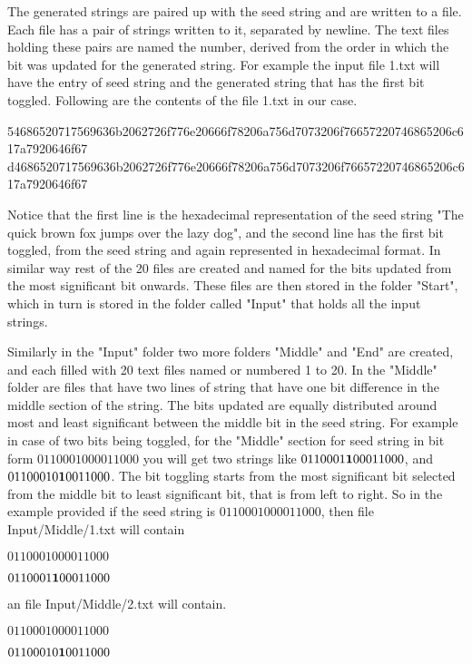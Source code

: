 The generated strings are paired up with the seed string and are written to a file. Each file has a pair of
strings written to it, separated by newline. The text files holding these pairs are named the number, derived
from the order in which the bit was updated for the generated string. For example the input file 1.txt will
have the entry of seed string and the generated string that has the first bit toggled. Following are the
contents of the file 1.txt in our case.

\begin{center}54686520717569636b2062726f776e20666f78206a756d7073206f76657220746865206c617a7920646f67
d4686520717569636b2062726f776e20666f78206a756d7073206f76657220746865206c617a7920646f67\end{center}

Notice that the first line is the hexadecimal representation of the seed string "The quick brown fox jumps over
the lazy dog", and the second line has the first bit toggled, from the seed string and again represented in
hexadecimal format. In similar way rest of the 20 files are created and named for the bits updated from the most 
significant bit onwards. These files are then stored in the folder "Start", which in turn is stored in the folder 
called "Input" that holds all the input strings.

Similarly in the "Input" folder two more folders "Middle" and "End" are created, and each filled with 20 text
files named or numbered 1 to 20. In the "Middle" folder are files that have two lines of string that have one
bit difference in the middle section of the string. The bits updated are equally distributed around most and least
significant between the middle bit in the seed string. For example in case of two bits being toggled, for the 
"Middle" section for seed string in bit form $01100010 00011000$ you will get two strings like $0110001{\bf 1}
00011000$, and $01100010 {\bf 1}0011000$. The bit toggling starts from the most significant bit selected from 
the middle bit to least significant bit, that is from left to right. So in the example provided if the seed string
is $01100010 00011000$, then file Input/Middle/1.txt will contain 

\begin{center}$01100010 00011000$

$0110001{\bf 1} 00011000$\end{center}

an file Input/Middle/2.txt will contain.

\begin{center}$01100010 00011000$

$01100010 {\bf 1}0011000$\end{center}


